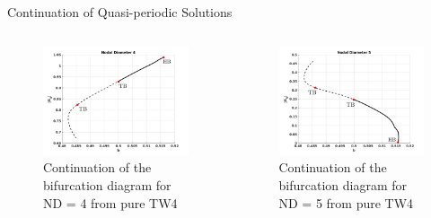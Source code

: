 \documentclass[dvipsnames, aspectratio = 169]{beamer}
\begin{document}
\begin{frame}{Continuation of Quasi-periodic Solutions}
	\begin{columns}
		\begin{column}{0.5\textwidth}
			\begin{figure}[h!]
				\centering
				\includegraphics[width = 1\textwidth]{U4TW4.png}
				\caption{Continuation of the bifurcation diagram for ND = 4 from pure TW4}
				\label{fig:A_4newbranchbifurcationTW4}
			\end{figure}
		\end{column}
		\begin{column}{0.5\textwidth}
			\begin{figure}[h!]
				\centering
				\includegraphics[width = 1\textwidth]{U5TW4.png}
				\caption{Continuation of the bifurcation diagram for ND = 5 from pure TW4}
				\label{fig:A_5newbranchbifurcationTW4}
			\end{figure}
		\end{column}
	\end{columns}
\end{frame}
\end{document}
